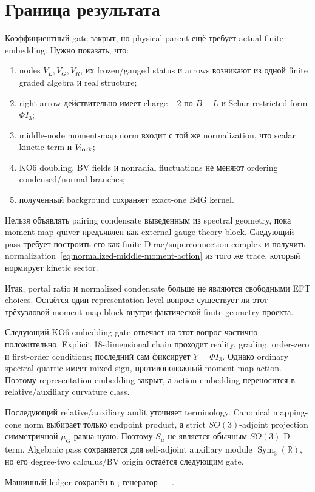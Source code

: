 \section{Граница результата}

Коэффициентный gate закрыт, но physical parent ещё требует actual finite
embedding. Нужно показать, что:
\begin{enumerate}
 \item nodes \(V_L,V_G,V_R\), их frozen/gauged status и arrows возникают
 из одной finite graded algebra и real structure;
 \item right arrow действительно имеет charge \(-2\) по \(B-L\) и
 Schur-restricted form \(\Phi I_3\);
 \item middle-node moment-map norm входит с той же normalization, что
 scalar kinetic term и \(V_{\rm lock}\);
 \item KO6 doubling, BV fields и nonradial fluctuations не меняют
 ordering condensed/normal branches;
 \item полученный background сохраняет exact-one BdG kernel.
\end{enumerate}

\begin{nogocriterion}
Нельзя объявлять pairing condensate выведенным из spectral geometry, пока
moment-map quiver предъявлен как external gauge-theory block. Следующий pass
требует построить его как finite Dirac/superconnection complex и получить
normalization~\eqref{eq:normalized-middle-moment-action} из того же trace,
который нормирует kinetic sector.
\end{nogocriterion}

Итак, portal ratio и normalized condensate больше не являются свободными
EFT choices. Остаётся один representation-level вопрос: существует ли этот
трёхузловой moment-map block внутри фактической finite geometry проекта.

Следующий KO6 embedding gate отвечает на этот вопрос частично положительно.
Explicit 18-dimensional chain проходит reality, grading, order-zero и
first-order conditions; последний сам фиксирует \(Y=\Phi I_3\). Однако
ordinary spectral quartic имеет mixed sign, противоположный moment-map
action. Поэтому representation embedding закрыт, а action embedding
переносится в relative/auxiliary curvature class.

Последующий relative/auxiliary audit уточняет terminology. Canonical
mapping-cone norm выбирает только endpoint product, а strict
\(SO(3)\)-adjoint projection симметричной \(\mu_G\) равна нулю. Поэтому
\(S_\mu\) не является обычным \(SO(3)\) D-term. Algebraic pass сохраняется
для self-adjoint auxiliary module \(\operatorname{Sym}_3(\mathbb R)\), но
его degree-two calculus/BV origin остаётся следующим gate.

Машинный ledger сохранён в
; генератор
--- .